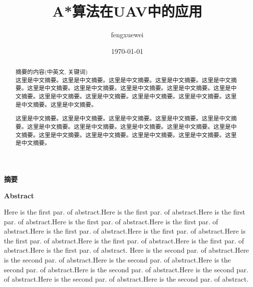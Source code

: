\documentclass[UTF8,twocolumn, a4paper]{ctexart}
\title{A*算法在UAV中的应用}
\author{fengxuewei}
\date{\today}
\begin{document}

    \maketitle

    \tableofcontents %
    \thispagestyle{empty} %
    \clearpage %
    
    
    \begin{center}
    \large{\textbf{摘要}}
    \end{center}
    \begin{abstract}{1cm}{1cm}
        摘要的内容(中英文, 关键词)\\
        这里是中文摘要。这里是中文摘要。这里是中文摘要。这里是中文摘要。这里是中文摘要。这里是中文摘要。这里是中文摘要。这里是中文摘要。这里是中文摘要。这里是中文摘要。这里是中文摘要。这里是中文摘要。这里是中文摘要。这里是中文摘要。这里是中文摘要。这里是中文摘要。
        
        这里是中文摘要。这里是中文摘要。这里是中文摘要。这里是中文摘要。这里是中文摘要。这里是中文摘要。这里是中文摘要。这里是中文摘要。这里是中文摘要。这里是中文摘要。这里是中文摘要。这里是中文摘要。这里是中文摘要。这里是中文摘要。这里是中文摘要。
    \end{abstract}    
    \clearpage %

    \begin{center}
    \large{\textbf{Abstract}}
    \end{center}

    \begin{adjustwidth}{1cm}{1cm}
    \hspace{1.5em}Here is the first par. of abstract.Here is the first par. of abstract.Here is the first par. of abstract.Here is the first par. of abstract.Here is the first par. of abstract.Here is the first par. of abstract.Here is the first par. of abstract.Here is the first par. of abstract.Here is the first par. of abstract.Here is the first par. of abstract.Here is the first par. of abstract. 
    \noindent\hspace{1.5em}Here is the second par. of abstract.Here is the second par. of abstract.Here is the second par. of abstract.Here is the second par. of abstract.Here is the second par. of abstract.Here is the second par. of abstract.Here is the second par. of abstract.Here is the second par. of abstract.
    \end{adjustwidth}
    \clearpage %
        
\end{document}
